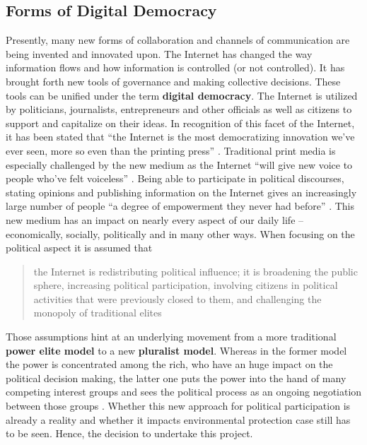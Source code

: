 \subsection{Forms of Digital Democracy}
\label{subsec:digdemocracy}
Presently, many new forms of collaboration and channels of communication are being invented and innovated upon. The Internet has changed the way information flows and how information is controlled (or not controlled). It has brought forth new tools of governance and making collective decisions. These tools can be unified under the term \textbf{digital democracy}. The Internet is utilized by politicians, journalists, entrepreneurs and other officials as well as citizens to support and capitalize on their ideas. In recognition of this facet of the Internet, it has been stated that ``the Internet is the most democratizing innovation we've ever seen, more so even than the printing press'' \citep[pg. 2]{Hindman09}. Traditional print media is especially challenged by the new medium as the Internet ``will give new voice to people who've felt voiceless'' \citep[pg. 2]{Hindman09}. Being able to participate in political discourses, stating opinions and publishing information on the Internet gives an increasingly large number of people ``a degree of empowerment they never had before'' \citep[pg. 2]{Hindman09}. This new medium has an impact on nearly every aspect of our daily life -- economically, socially, politically and in many other ways. When focusing on the political aspect it is assumed that \begin{quote}the Internet is redistributing political influence; it is broadening the public sphere, increasing political participation, involving citizens in political activities that were previously closed to them, and challenging the monopoly of traditional elites \citep[pg. 6]{Hindman09}\end{quote}Those assumptions hint at an underlying movement from a more traditional \textbf{power elite model} to a new \textbf{pluralist model}. Whereas in the former model the power is concentrated among the rich, who have an huge impact on the political decision making, the latter one puts the power into the hand of many competing interest groups and sees the political process as an ongoing negotiation between those groups \citep[pg. 550]{Plummer11}. Whether this new approach for political participation is already a reality and whether it impacts environmental protection case still has to be seen. Hence, the decision to undertake this project.\par\vspace{0.2cm}

